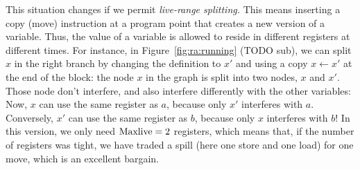 {


This situation changes if we permit \emph{live-range splitting.} 
This means inserting a copy (move) instruction at a program point that creates a new version of a variable. 
Thus, the value of a variable is allowed to reside in different registers at different times. 
For instance, in Figure~\ref{fig:ra:running} (TODO sub), we can split $x$ in the right branch by changing the definition to $x'$ and using a copy $x \gets x'$ at the end of the block:
the node $x$ in the graph is split into two nodes, $x$ and $x'$.
Those node don't interfere, and also interfere differently with the other variables:
Now, $x$ can use the same register as $a$, because only $x'$ interferes with $a$.
Conversely, $x'$ can use the same register as $b$, because only $x$ interferes with $b$!
In this version, we only need $\mathrm{Maxlive} = 2$ registers, which means that, if the number of registers was tight, we have traded a spill (here one store and one load) for one move, which is an excellent bargain.


}
